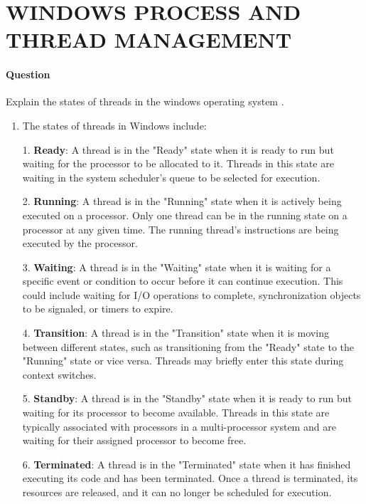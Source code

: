 \documentclass[a4paper,12pt,fleqn]{article}
\newcounter{question}
\newcommand*\question{%
\stepcounter{question}%
\paragraph{Question \thequestion}}
\begin{document}
\section{WINDOWS PROCESS AND THREAD MANAGEMENT}
\question 
{
	Explain the states of threads in the windows operating system
}.
\begin{enumerate}

\item{} 
{
	 The states of threads in Windows include:
}
\begin{answer}
{

1. \textbf{Ready}: A thread is in the "Ready" state when it is ready to run but waiting for the processor to be allocated to it. Threads in this state are waiting in the system scheduler's queue to be selected for execution.

2. \textbf{Running}: A thread is in the "Running" state when it is actively being executed on a processor. Only one thread can be in the running state on a processor at any given time. The running thread's instructions are being executed by the processor.

3. \textbf{Waiting}: A thread is in the "Waiting" state when it is waiting for a specific event or condition to occur before it can continue execution. This could include waiting for I/O operations to complete, synchronization objects to be signaled, or timers to expire.

4. \textbf{Transition}: A thread is in the "Transition" state when it is moving between different states, such as transitioning from the "Ready" state to the "Running" state or vice versa. Threads may briefly enter this state during context switches.

5. \textbf{Standby}: A thread is in the "Standby" state when it is ready to run but waiting for its processor to become available. Threads in this state are typically associated with processors in a multi-processor system and are waiting for their assigned processor to become free.

6. \textbf{Terminated}: A thread is in the "Terminated" state when it has finished executing its code and has been terminated. Once a thread is terminated, its resources are released, and it can no longer be scheduled for execution.

}
\end{answer}

\end{enumerate}
\end{document}
